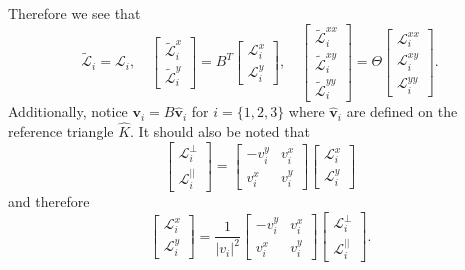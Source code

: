 Therefore we see that
\begin{equation*}
  \tilde{\mathcal{L}}_i = \mathcal{L}_i, \quad
  \begin{bmatrix}
    \tilde{\mathcal{L}}^x_i \\ \tilde{\mathcal{L}}^y_i
  \end{bmatrix} = B^T \begin{bmatrix}
    \mathcal{L}^x_i \\ \mathcal{L}^y_i
  \end{bmatrix}, \quad
  \begin{bmatrix}
    \tilde{\mathcal{L}}^{xx}_i \\ \tilde{\mathcal{L}}^{xy}_i \\ \tilde{\mathcal{L}}^{yy}_i
  \end{bmatrix} = \Theta \begin{bmatrix}
    \mathcal{L}^{xx}_i \\ \mathcal{L}^{xy}_i \\ \mathcal{L}^{yy}_i
  \end{bmatrix}.
\end{equation*}
Additionally, notice $\mathbf{v}_i = B\hat{\mathbf{v}}_i$ for
$i=\{1,2,3\}$ where $\hat{\mathbf{v}}_i$ are defined on the reference triangle
$\hat{K}$. It should also be noted that
\begin{equation*}
  \begin{bmatrix}
    \mathcal{L}^{\perp}_i \\ \mathcal{L}^{||}_i
  \end{bmatrix} = \begin{bmatrix} -v^y_i & v^x_i \\ v^x_i & v^y_i \end{bmatrix}
  \begin{bmatrix}
    \mathcal{L}^x_i \\ \mathcal{L}^y_i
  \end{bmatrix}
\end{equation*}
and therefore
\begin{equation*}
  \begin{bmatrix}
    \mathcal{L}^{x}_i \\ \mathcal{L}^{y}_i
  \end{bmatrix} = \frac{1}{|v_i|^2}
  \begin{bmatrix} -v^y_i & v^x_i \\ v^x_i & v^y_i \end{bmatrix}
  \begin{bmatrix}
    \mathcal{L}^{\perp}_i \\ \mathcal{L}^{||}_i
  \end{bmatrix}.
\end{equation*}

